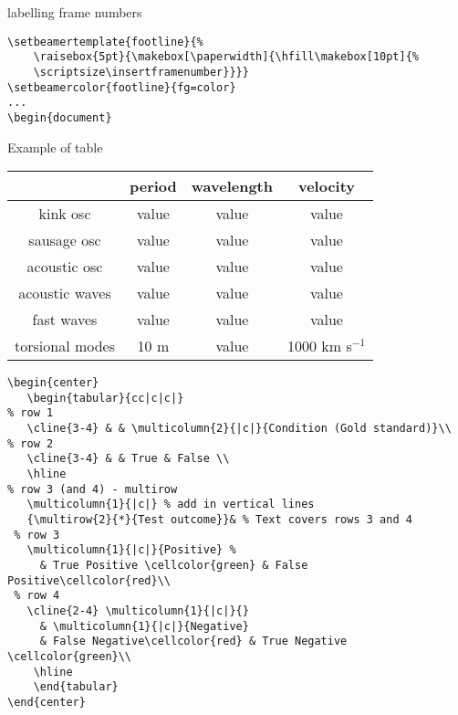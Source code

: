 \documentclass[9pt]{beamer}
\begin{document}
\begin{frame}[fragile=singleslide]{labelling frame numbers}
    \begin{verbatim}
\setbeamertemplate{footline}{%
    \raisebox{5pt}{\makebox[\paperwidth]{\hfill\makebox[10pt]{%
    \scriptsize\insertframenumber}}}}
\setbeamercolor{footline}{fg=color}
...
\begin{document}
    \end{verbatim}
\end{frame}%
\begin{frame}{Example of table}
    \begin{center}
        \begin{tabular}{c|c|c|c|}
            \cline{2-4} & {\textbf{period}} & {\textbf{wavelength}} &
                {\textbf{velocity}}\\
            \hline \multicolumn{0}{|c|}{kink osc} & value & value & value\\
            \hline \multicolumn{0}{|c|}{sausage osc} & value & value & value\\
            \hline \multicolumn{0}{|c|}{acoustic osc} & value & value & value\\
            \hline \multicolumn{0}{|c|}{acoustic waves} & value & value & value\\
            \hline \multicolumn{0}{|c|}{fast waves} & value & value & value\\
            \hline \multicolumn{0}{|c|}{torsional modes} & 10 m & value &
                1000 km s$^{-1}$\\
            \hline
        \end{tabular}
    \end{center}
\end{frame}%
    \begin{verbatim}
\begin{center}
   \begin{tabular}{cc|c|c|}
% row 1
   \cline{3-4} & & \multicolumn{2}{|c|}{Condition (Gold standard)}\\
% row 2
   \cline{3-4} & & True & False \\
   \hline
% row 3 (and 4) - multirow
   \multicolumn{1}{|c|} % add in vertical lines
   {\multirow{2}{*}{Test outcome}}& % Text covers rows 3 and 4
 % row 3
   \multicolumn{1}{|c|}{Positive} %
     & True Positive \cellcolor{green} & False Positive\cellcolor{red}\\
 % row 4
   \cline{2-4} \multicolumn{1}{|c|}{}
     & \multicolumn{1}{|c|}{Negative}
     & False Negative\cellcolor{red} & True Negative \cellcolor{green}\\
    \hline
    \end{tabular}
\end{center}
    \end{verbatim}
\end{document}
